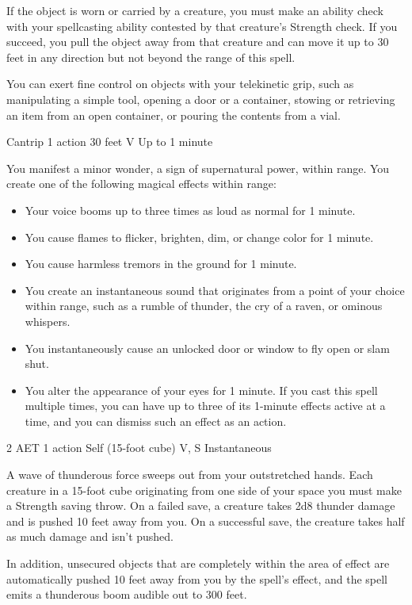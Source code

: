 If the object is worn or carried by a creature, you must make an ability check with your spellcasting ability contested by that creature's Strength check. If you succeed, you pull the object away from that creature and can move it up to 30 feet in any direction but not beyond the range of this spell.

You can exert fine control on objects with your telekinetic grip, such as manipulating a simple tool, opening a door or a container, stowing or retrieving an item from an open container, or pouring the contents from a vial.


{Cantrip}
{1 action}
{30 feet}
{V}
{Up to 1 minute}

You manifest a minor wonder, a sign of supernatural power, within range. You create one of the following magical effects within range:
\begin{itemize}
\item Your voice booms up to three times as loud as normal for 1 minute.
\item You cause flames to flicker, brighten, dim, or change color for 1 minute.
\item You cause harmless tremors in the ground for 1 minute.
\item You create an instantaneous sound that originates from a point of your choice within range, such as a rumble of thunder, the cry of a raven, or ominous whispers.
\item You instantaneously cause an unlocked door or window to fly open or slam shut.
\item You alter the appearance of your eyes for 1 minute. If you cast this spell multiple times, you can have up to three of its 1-minute effects active at a time, and you can dismiss such an effect as an action.
\end{itemize}


{2 AET}
{1 action}
{Self (15-foot cube)}
{V, S}
{Instantaneous}

A wave of thunderous force sweeps out from your outstretched hands. Each creature in a 15-foot cube originating from one side of your space you must make a Strength saving throw. On a failed save, a creature takes 2d8 thunder damage and is pushed 10 feet away from you. On a successful save, the creature takes half as much damage and isn't pushed.

In addition, unsecured objects that are completely within the area of effect are automatically pushed 10 feet away from you by the spell's effect, and the spell emits a thunderous boom audible out to 300 feet.

